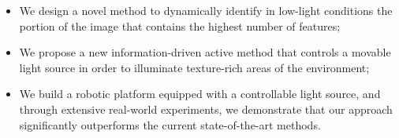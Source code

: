 
\begin{itemize}
    \item We design a novel method to dynamically identify in low-light conditions the portion of the image that contains the highest number of features;
    \item We propose a new information-driven active method that controls a movable light source in order to illuminate texture-rich areas of the environment;
    \item We build a robotic platform equipped with a controllable light source, and through extensive real-world experiments, we demonstrate that our approach significantly outperforms the current state-of-the-art methods.
\end{itemize}